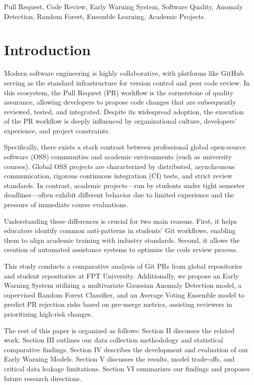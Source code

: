 \documentclass[conference]{IEEEtran}
\begin{document}
\begin{IEEEkeywords}
Pull Request, Code Review, Early Warning System, Software Quality, Anomaly Detection, Random Forest, Ensemble Learning, Academic Projects.
\end{IEEEkeywords}

\section{Introduction}
Modern software engineering is highly collaborative, with platforms like GitHub serving as the standard infrastructure for version control and peer code review. In this ecosystem, the Pull Request (PR) workflow is the cornerstone of quality assurance, allowing developers to propose code changes that are subsequently reviewed, tested, and integrated. Despite its widespread adoption, the execution of the PR workflow is deeply influenced by organizational culture, developers' experience, and project constraints.

Specifically, there exists a stark contrast between professional global open-source software (OSS) communities and academic environments (such as university courses). Global OSS projects are characterized by distributed, asynchronous communication, rigorous continuous integration (CI) tests, and strict review standards. In contrast, academic projects—run by students under tight semester deadlines—often exhibit different behavior due to limited experience and the pressure of immediate course evaluations.

Understanding these differences is crucial for two main reasons. First, it helps educators identify common anti-patterns in students' Git workflows, enabling them to align academic training with industry standards. Second, it allows the creation of automated assistance systems to optimize the code review process.

This study conducts a comparative analysis of Git PRs from global repositories and student repositories at FPT University. Additionally, we propose an Early Warning System utilizing a multivariate Gaussian Anomaly Detection model, a supervised Random Forest Classifier, and an Average Voting Ensemble model to predict PR rejection risks based on pre-merge metrics, assisting reviewers in prioritizing high-risk changes.

The rest of this paper is organized as follows: Section II discusses the related work. Section III outlines our data collection methodology and statistical comparative findings. Section IV describes the development and evaluation of our Early Warning Models. Section V discusses the results, model trade-offs, and critical data leakage limitations. Section VI summarizes our findings and proposes future research directions.
\end{document}
